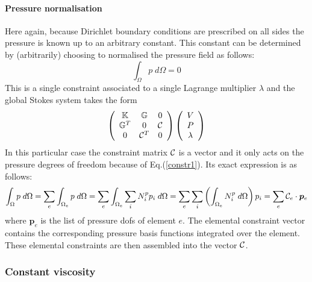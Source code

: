 \paragraph{Pressure normalisation} Here again, because Dirichlet boundary conditions are prescribed on all sides the 
pressure is known up to an arbitrary constant. This constant can be determined by (arbitrarily) choosing 
to normalised the pressure field as follows:
\begin{equation}
\int_\Omega p \; d\Omega = 0 \label{constr1}
\end{equation}
This is a single constraint associated to a single Lagrange multiplier $\lambda$ and the global Stokes system takes the form 
\[
\left(
\begin{array}{ccc}
{\mathbb{K}} & {\mathbb{G}} & 0 \\
{\mathbb{G}}^T & 0 & {\cal C}\\
0 & {\cal C}^T & 0
\end{array}
\right)
\left(
\begin{array}{c}
V \\ P \\ \lambda
\end{array}
\right)
\]
In this particular case the constraint matrix ${\cal C}$ is a vector and it only acts on the pressure degrees of freedom because
of Eq.(\ref{constr1}). Its exact expression is as follows:
\[
\int_\Omega p \; d\Omega = \sum_e \int_{\Omega_e}  p \; d\Omega 
=\sum_e \int_{\Omega_e}  \sum_{i} N^p_i p_i \; d\Omega  
=\sum_e \sum_i \left( \int_{\Omega_e}  N^p_i \; d\Omega \right)  p_i 
=\sum_e {\cal C}_e \cdot {\bm p}_e
\] 
where ${\bm p}_e$ is the list of pressure dofs of element $e$. The elemental constraint vector contains the 
corresponding pressure basis functions integrated over the element. These elemental constraints are then 
assembled into the vector ${\cal C}$.

\subsubsection{Constant viscosity}

